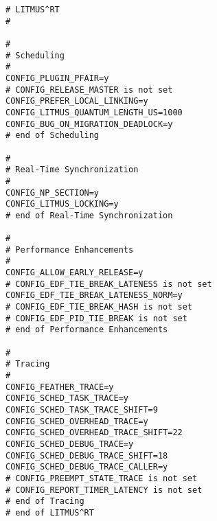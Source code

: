 \begin{lstlisting}[style=config, caption=Partie du fichier .config liée a \litmus]
# LITMUS^RT
#

#
# Scheduling
#
CONFIG_PLUGIN_PFAIR=y
# CONFIG_RELEASE_MASTER is not set
CONFIG_PREFER_LOCAL_LINKING=y
CONFIG_LITMUS_QUANTUM_LENGTH_US=1000
CONFIG_BUG_ON_MIGRATION_DEADLOCK=y
# end of Scheduling

#
# Real-Time Synchronization
#
CONFIG_NP_SECTION=y
CONFIG_LITMUS_LOCKING=y
# end of Real-Time Synchronization

#
# Performance Enhancements
#
CONFIG_ALLOW_EARLY_RELEASE=y
# CONFIG_EDF_TIE_BREAK_LATENESS is not set
CONFIG_EDF_TIE_BREAK_LATENESS_NORM=y
# CONFIG_EDF_TIE_BREAK_HASH is not set
# CONFIG_EDF_PID_TIE_BREAK is not set
# end of Performance Enhancements

#
# Tracing
#
CONFIG_FEATHER_TRACE=y
CONFIG_SCHED_TASK_TRACE=y
CONFIG_SCHED_TASK_TRACE_SHIFT=9
CONFIG_SCHED_OVERHEAD_TRACE=y
CONFIG_SCHED_OVERHEAD_TRACE_SHIFT=22
CONFIG_SCHED_DEBUG_TRACE=y
CONFIG_SCHED_DEBUG_TRACE_SHIFT=18
CONFIG_SCHED_DEBUG_TRACE_CALLER=y
# CONFIG_PREEMPT_STATE_TRACE is not set
# CONFIG_REPORT_TIMER_LATENCY is not set
# end of Tracing
# end of LITMUS^RT
\end{lstlisting}


